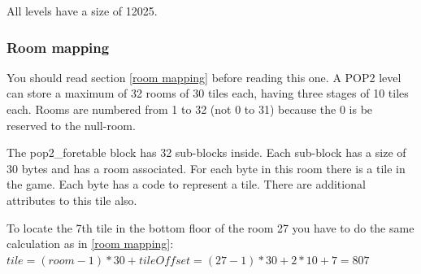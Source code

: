 \documentclass{article}
\begin{document}

 All levels have a size of 12025.

\subsubsection{Room mapping \label{dat2 room mapping}} %
 You should read section \ref{room mapping} before reading this one.
 A POP2 level can store a maximum of 32 rooms of 30 tiles each, having 
 three stages of 10 tiles each. Rooms are numbered from 1 to 32 (not 0 to 
 31) because the 0 is be reserved to the null-room.

 The pop2\_foretable block has 32 sub-blocks inside. Each sub-block has a
 size of 30 bytes and has a room associated. For each byte in this room
 there is a tile in the game. Each byte has a code to represent a tile.
 There are additional attributes to this tile also.
 
 To locate the 7th tile in the bottom floor of the room 27 you have to do
 the same calculation as in \ref{room mapping}:
  $tile=(room-1)*30+tileOffset=(27-1)*30+2*10+7=807$
 
\end{document}
